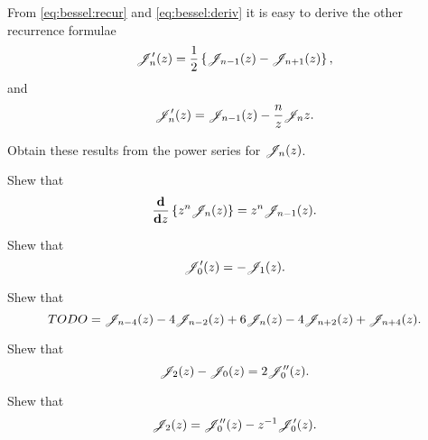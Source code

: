 From \eqref{eq:bessel:recur} and \eqref{eq:bessel:deriv} it is easy to
derive the other recurrence formulae
\begin{equation}
  \mathscr{J}'_{n}(z) = \frac{1}{2} \left\{  \mathscr{J}_{n-1}(z) - \mathscr{J}_{n+1}(z)   \right\},
\end{equation}
and
\begin{equation}
  \mathscr{J}'_{n}(z) = \mathscr{J}_{n-1}(z) - \frac{n}{z} \mathscr{J}_{n}{z}.
\end{equation}
\begin{wandwexample}
  Obtain these results from the power series for $\mathscr{J}_{n}(z)$.
\end{wandwexample}
\begin{wandwexample}
  Shew that 
  $$
  \frac{\mathbf{d}}{\mathbf{d} z} \left\{  z^{n} \mathscr{J}_{n}(z)  \right\} = z^{n} \mathscr{J}_{n-1}(z).
  $$
\end{wandwexample}
\begin{wandwexample}
  Shew that
  $$
  \mathscr{J}'_{0}(z) = -\mathscr{J}_{1}(z).
  $$
\end{wandwexample}
\begin{wandwexample}
  Shew that
  $$
  TODO = \mathscr{J}_{n-4}(z) - 4 \mathscr{J}_{n-2}(z) + 6 \mathscr{J}_{n}(z) - 4 \mathscr{J}_{n+2}(z) + \mathscr{J}_{n+4}(z).
  $$
\end{wandwexample}
\begin{wandwexample}
  Shew that
  $$
  \mathscr{J}_{2}(z) - \mathscr{J}_{0}(z) = 2 \mathscr{J}''_{0}(z).
  $$
\end{wandwexample}
\begin{wandwexample}
  Shew that
  $$
  \mathscr{J}_{2}(z) = \mathscr{J}''_{0}(z) - z^{-1} \mathscr{J}'_{0}(z).
  $$
\end{wandwexample}


